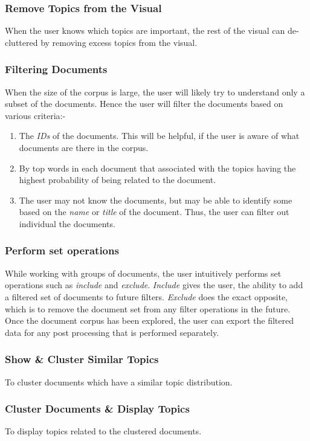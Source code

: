 \documentclass[10pt,journal,compsoc]{IEEEtran}
\begin{document}
\subsubsection{Remove Topics from the Visual}
When the user knows which topics are important, the rest of the visual can de-cluttered by removing excess topics from the visual.

\subsubsection{Filtering Documents}
When the size of the corpus is large, the user will likely try to understand only a subset of the documents. Hence the user will filter the documents based on various criteria:-
\begin{enumerate}
\item The \textit{IDs} of the documents. This will be helpful, if the user is aware of what documents are there in the corpus.
\item By top words in each document that associated with the topics having the highest probability of being related to the document.
\item The user may not know the documents, but may be able to identify some based on the \textit{name} or \textit{title} of the document. Thus, the user can filter out individual the documents.
\end{enumerate}

\subsubsection{Perform set operations}
While working with groups of documents, the user intuitively performs set operations such as \textit{include} and \textit{exclude}. \textit{Include} gives the user, the ability to add a filtered set of documents to future filters. \textit{Exclude} does the exact opposite, which is to remove the document set from any filter operations in the future. Once the document corpus has been explored, the user can export the filtered data for any post processing that is performed separately.

\subsubsection{Show \& Cluster Similar Topics}

To cluster documents which have a similar topic distribution.

\subsubsection{Cluster Documents \& Display Topics  }
To display topics related to the clustered documents.
\end{document}
